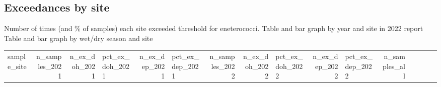 \documentclass[
]{article}
\begin{document}
\hypertarget{exceedances-by-site}{%
\subsection{Exceedances by site}\label{exceedances-by-site}}

Number of times (and \% of samples) each site exceeded threshold for
eneterococci. Table and bar graph by year and site in 2022 report Table
and bar graph by wet/dry season and site

\begin{longtable}[]{@{}lrrlrlrrlrlrrlrl@{}}
\toprule
\begin{minipage}[b]{0.08\columnwidth}\raggedright
sample\_site\strut
\end{minipage} & \begin{minipage}[b]{0.04\columnwidth}\raggedleft
n\_samples\_2021\strut
\end{minipage} & \begin{minipage}[b]{0.03\columnwidth}\raggedleft
n\_ex\_doh\_2021\strut
\end{minipage} & \begin{minipage}[b]{0.04\columnwidth}\raggedright
pct\_ex\_doh\_2021\strut
\end{minipage} & \begin{minipage}[b]{0.03\columnwidth}\raggedleft
n\_ex\_dep\_2021\strut
\end{minipage} & \begin{minipage}[b]{0.04\columnwidth}\raggedright
pct\_ex\_dep\_2021\strut
\end{minipage} & \begin{minipage}[b]{0.04\columnwidth}\raggedleft
n\_samples\_2022\strut
\end{minipage} & \begin{minipage}[b]{0.03\columnwidth}\raggedleft
n\_ex\_doh\_2022\strut
\end{minipage} & \begin{minipage}[b]{0.04\columnwidth}\raggedright
pct\_ex\_doh\_2022\strut
\end{minipage} & \begin{minipage}[b]{0.03\columnwidth}\raggedleft
n\_ex\_dep\_2022\strut
\end{minipage} & \begin{minipage}[b]{0.04\columnwidth}\raggedright
pct\_ex\_dep\_2022\strut
\end{minipage} & \begin{minipage}[b]{0.03\columnwidth}\raggedleft
n\_samples\_all\strut
\end{minipage} & \begin{minipage}[b]{0.03\columnwidth}\raggedleft

\end{minipage}
\end{longtable}
\end{document}
